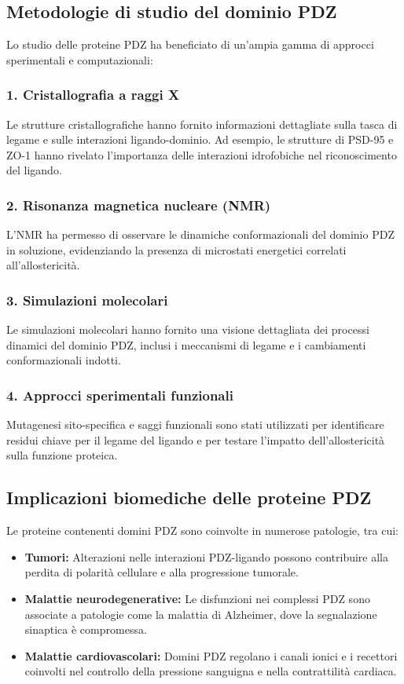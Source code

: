 \documentclass[Lau,binding=0.6cm,oneside,noexaminfo]{sapthesis}
\begin{document}
\subsection*{Metodologie di studio del dominio PDZ}

Lo studio delle proteine PDZ ha beneficiato di un’ampia gamma di approcci sperimentali e computazionali:

\subsubsection*{1. Cristallografia a raggi X}
Le strutture cristallografiche hanno fornito informazioni dettagliate sulla tasca di legame e sulle interazioni ligando-dominio. Ad esempio, le strutture di PSD-95 e ZO-1 hanno rivelato l’importanza delle interazioni idrofobiche nel riconoscimento del ligando.

\subsubsection*{2. Risonanza magnetica nucleare (NMR)}
L’NMR ha permesso di osservare le dinamiche conformazionali del dominio PDZ in soluzione, evidenziando la presenza di microstati energetici correlati all’allostericità.

\subsubsection*{3. Simulazioni molecolari}
Le simulazioni molecolari hanno fornito una visione dettagliata dei processi dinamici del dominio PDZ, inclusi i meccanismi di legame e i cambiamenti conformazionali indotti.

\subsubsection*{4. Approcci sperimentali funzionali}
Mutagenesi sito-specifica e saggi funzionali sono stati utilizzati per identificare residui chiave per il legame del ligando e per testare l’impatto dell’allostericità sulla funzione proteica.

\subsection*{Implicazioni biomediche delle proteine PDZ}

Le proteine contenenti domini PDZ sono coinvolte in numerose patologie, tra cui:
\begin{itemize}
    \item \textbf{Tumori:} Alterazioni nelle interazioni PDZ-ligando possono contribuire alla perdita di polarità cellulare e alla progressione tumorale.
    \item \textbf{Malattie neurodegenerative:} Le disfunzioni nei complessi PDZ sono associate a patologie come la malattia di Alzheimer, dove la segnalazione sinaptica è compromessa.
    \item \textbf{Malattie cardiovascolari:} Domini PDZ regolano i canali ionici e i recettori coinvolti nel controllo della pressione sanguigna e nella contrattilità cardiaca.
\end{itemize}
\end{document}
